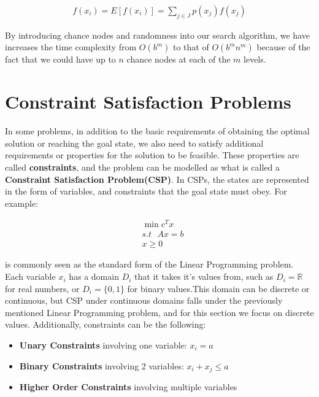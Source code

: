 \documentclass[12pt]{article}
\begin{document}
\begin{equation*}
\begin{aligned}
f(x_i) = E[f(x_i)]  = \sum_{j \in J} p(x_j) f(x_j)
\end{aligned}
\end{equation*}

By introducing chance nodes and randomness into our search algorithm, we have increases the time complexity from $O(b^m)$ to that of $O(b^mn^m)$ because of the fact that we could have up to $n$ chance nodes at each of the $m$ levels.

\pagebreak
\section{Constraint Satisfaction Problems}

In some problems, in addition to the basic requirements of obtaining the optimal solution or reaching the goal state, we also need to satisfy additional requirements or properties for the solution to be feasible. These properties are called \textbf{constraints}, and the problem can be modelled as what is called a \textbf{Constraint Satisfaction Problem(CSP)}. In CSPs, the states are represented in the form of variables, and constraints that the goal state must obey. For example:

\begin{equation*}
\begin{aligned}
&\min c^T x\\
&s.t \textbf{	} Ax = b\\
&x \geq 0
\end{aligned}
\end{equation*}

is commonly seen as the standard form of the Linear Programming problem. \\

Each variable $x_i$  has a domain $D_i$ that it takes it's values from, such as $D_i = \mathbb{R}$ for real numbers, or $D_i = \{0, 1\}$ for binary values.This domain can be discrete or continuous, but CSP under continuous domains falls under the previously mentioned Linear Programming problem, and for this section we focus on discrete values. Additionally, constraints can be the following:

\begin{itemize}
\item \textbf{Unary Constraints} involving one variable: $x_i = a$
\item \textbf{Binary Constraints} involving 2 variables: $x_i + x_j \leq a$
\item \textbf{Higher Order Constraints} involving multiple variables
\end{itemize}
\end{document}
